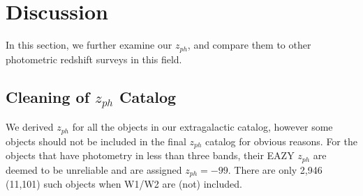 \documentclass[apj,iop]{emulateapj}
\begin{document}


\section{Discussion}


In this section, we further examine our $z_{ph}$, and compare them to other photometric redshift surveys in this field.


\subsection{Cleaning of $z_{ph}$ Catalog}

We derived $z_{ph}$ for all the objects in our extragalactic catalog, however some objects should not be included in the final $z_{ph}$ catalog for obvious reasons.
For the objects that have photometry in less than three bands, their EAZY $z_{ph}$ are deemed to be unreliable and are assigned $z_{ph}=-99$. There are only 2,946 (11,101) such objects when W1/W2 are (not) included.

\end{document}
